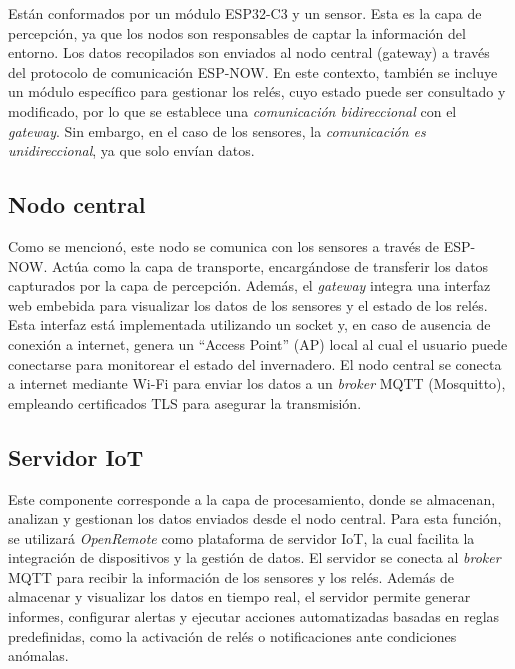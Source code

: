 Están conformados por un módulo ESP32-C3 y un sensor. Esta es la capa de percepción, ya que los nodos son responsables de captar la información del entorno. Los datos recopilados son enviados al nodo central (gateway) a través del protocolo de comunicación ESP-NOW. En este contexto, también se incluye un módulo específico para gestionar los relés, cuyo estado puede ser consultado y modificado, por lo que se establece una \textit{comunicación bidireccional} con el \textit{gateway}. Sin embargo, en el caso de los sensores, la \textit{comunicación es unidireccional}, ya que solo envían datos.

\subsection{Nodo central}

Como se mencionó, este nodo se comunica con los sensores a través de ESP-NOW. Actúa como la capa de transporte, encargándose de transferir los datos capturados por la capa de percepción. Además, el \textit{gateway} integra una interfaz web embebida para visualizar los datos de los sensores y el estado de los relés. Esta interfaz está implementada utilizando un socket y, en caso de ausencia de conexión a internet, genera un “Access Point” (AP) local al cual el usuario puede conectarse para monitorear el estado del invernadero. El nodo central se conecta a internet mediante Wi-Fi para enviar los datos a un \textit{broker} MQTT (Mosquitto), empleando certificados TLS para asegurar la transmisión.

\subsection{Servidor IoT}

Este componente corresponde a la capa de procesamiento, donde se almacenan, analizan y gestionan los datos enviados desde el nodo central. Para esta función, se utilizará \textit{OpenRemote} como plataforma de servidor IoT, la cual facilita la integración de dispositivos y la gestión de datos. El servidor se conecta al \textit{broker} MQTT para recibir la información de los sensores y los relés.
Además de almacenar y visualizar los datos en tiempo real, el servidor permite generar informes, configurar alertas y ejecutar acciones automatizadas basadas en reglas predefinidas, como la activación de relés o notificaciones ante condiciones anómalas.



